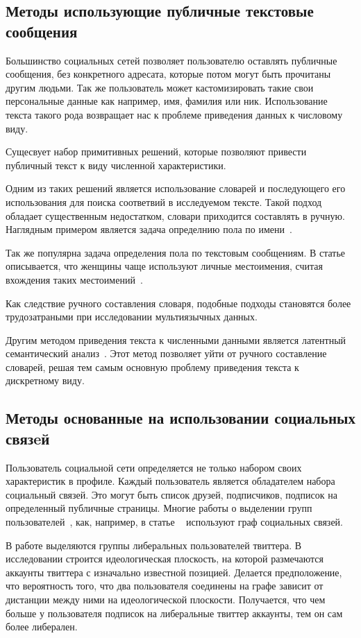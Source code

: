 \documentclass[annotation,times,page4]{itmo-student-thesis}
\begin{document}
\subsection{Методы использующие публичные текстовые сообщения}
Большинство социальных сетей позволяет пользователю оставлять публичные сообщения, без конкретного адресата, которые потом могут быть прочитаны другим людьми. Так же пользователь может кастомизировать такие свои персональные данные как например, имя, фамилия или ник. Использование текста такого рода возвращает нас к проблеме приведения данных к числовому виду.
 
Сущесвует набор примитивных решений, которые позволяют привести публичный текст к виду численной характеристики. 

Одним из таких решений является использование словарей и последующего его использования для поиска соответвий в исследуемом тексте. Такой подход обладает существенным недостатком, словари приходится составлять в ручную. Наглядным примером является задача определнию пола по имени~\cite{loan2013knowing}. 

Так же популярна задача определения пола по текстовым сообщениям. В статье описывается, что женщины чаще используют личные местоимения, считая вхождения таких местоимений~\cite{pennebaker2011your}.

Как следствие ручного составления словаря, подобные подходы становятся более трудозатраными при исследовании мультиязычных данных.

Другим методом приведения текста к численными данными является латентный семантический анализ~\cite{farseev2015harvesting}. Этот метод позволяет уйти от ручного составление словарей, решая тем самым основную проблему приведения текста к дискретному виду.
  
\subsection{Методы основанные на использовании социальных связeй}
Пользователь социальной сети определяется не только набором своих характеристик в профиле. Каждый пользователь является обладателем набора социальный связей. Это могут быть список друзей, подписчиков, подписок на определенный публичные страницы. Многие работы о выделении групп пользователей~\cite{trusov2010determining}, как, например, в статье ~\cite{barbera2015tweeting} используют граф социальных связей.

В работе выделяются группы либеральных пользователей твиттера. В исследовании строится идеологическая плоскость, на которой размечаются аккаунты твиттера с изначально известной позицией. Делается предположение, что вероятность того, что два пользователя соединены на графе зависит от дистанции между ними на идеологической плоскости. Получается, что чем больше у пользователя подписок на либеральные твиттер аккаунты, тем он сам более либерален.
\end{document}
